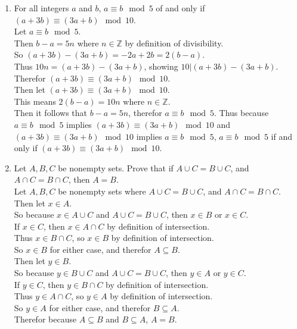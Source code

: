 \documentclass[sigconf]{article}
\begin{document}
\begin{enumerate}
  \item For all integers $a$ and $b$, $a\equiv b\mod 5$ of and only if $(a+3b)\equiv(3a+b)\mod 10$.\\
        Let $a\equiv b\mod 5$.\\
        Then $b-a=5n$ where $n\in\mathbb{Z}$ by definition of divisibility.\\
        So $(a+3b)-(3a+b)=-2a+2b=2(b-a)$.\\
        Thus $10n=(a+3b)-(3a+b)$, showing $10|(a+3b)-(3a+b)$.\\
        Therefor $(a+3b)\equiv(3a+b)\mod 10$.\\
        Then let $(a+3b)\equiv(3a+b)\mod 10$.\\
        This means $2(b-a)=10n$ where $n\in\mathbb{Z}$.\\
        Then it follows that $b-a=5n$, therefor $a\equiv b\mod 5$.
        Thus because $a\equiv b\mod 5$ implies $(a+3b)\equiv(3a+b)\mod 10$ and $(a+3b)\equiv(3a+b)\mod 10$ implies $a\equiv b\mod 5$, $a\equiv b\mod 5$ if and only if $(a+3b)\equiv(3a+b)\mod 10$.

  \item Let $A,B,C$ be nonempty sets. Prove that if $A\cup C=B\cup C$, and $A\cap C=B\cap C$, then $A=B$.\\
        Let $A,B,C$ be nonempty sets where $A\cup C=B\cup C$, and $A\cap C=B\cap C$.\\
        Then let $x\in A$.\\
        So because $x\in A\cup C$ and $A\cup C=B\cup C$, then $x\in B$ or $x\in C$.\\
        If $x\in C$, then $x\in A\cap C$ by definition of intersection.\\
        Thus $x\in B\cap C$, so $x\in B$ by definition of intersection.\\
        So $x\in B$ for either case, and therefor $A\subseteq B$.\\
        Then let $y\in B$.\\
        So because $y\in B\cup C$ and $A\cup C=B\cup C$, then $y\in A$ or $y\in C$.\\
        If $y\in C$, then $y\in B\cap C$ by definition of intersection.\\
        Thus $y\in A\cap C$, so $y\in A$ by definition of intersection.\\
        So $y\in A$ for either case, and therefor $B\subseteq A$.\\
        Therefor because $A\subseteq B$ and $B\subseteq A$, $A=B$.


\end{enumerate}
\end{document}
